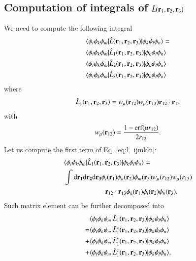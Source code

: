 \documentclass[aip,jcp,reprint,noshowkeys,superscriptaddress]{revtex4-1}
\newcommand{\matelem}[3]{\langle #1 | #2 | #3 \rangle}
\newcommand{\bri}[1]{{\bf r}_{#1}}
\newcommand{\dr}[1]{\text{d}{\bf r_{#1}}}
\begin{document}
\subsection{Computation of integrals of $\hat{L}(\bri{1},\bri{2},\bri{3})$}
We need to compute the following integral 
\begin{equation}
 \label{eq:l_ijmkln}
 \begin{aligned}
 & \matelem{\phi_i \phi_k \phi_m}{\hat{L}(\bri{1},\bri{2},\bri{3})}{\phi_k \phi_l \phi_n} = \\
 & \matelem{\phi_i \phi_k \phi_m}{\hat{L}_1(\bri{1},\bri{2},\bri{3})}{\phi_k \phi_l \phi_n} \\
 & \matelem{\phi_i \phi_k \phi_m}{\hat{L}_2(\bri{1},\bri{2},\bri{3})}{\phi_k \phi_l \phi_n} \\
 & \matelem{\phi_i \phi_k \phi_m}{\hat{L}_3(\bri{1},\bri{2},\bri{3})}{\phi_k \phi_l \phi_n} 
 \end{aligned}
\end{equation}
where 
\begin{equation}
 \hat{L}_1(\bri{1},\bri{2},\bri{3}) = w_\mu(\bri{12}) w_\mu(\bri{13}) \bri{12} \cdot \bri{13}
\end{equation}
with 
\begin{equation}
 w_\mu(\bri{12}) = \frac{1 - \text{erf}(\mu r_{12})}{2 r_{12}}.
\end{equation}
Let us compute the first term of Eq. \eqref{eq:l_ijmkln}:
\begin{equation}
 \begin{aligned}
 & \matelem{\phi_i \phi_k \phi_m}{\hat{L}_1(\bri{1},\bri{2},\bri{3})}{\phi_k \phi_l \phi_n} = \\
 & \int \dr{1} \dr{2} \dr{3} \phi_i(\bri{1}) \phi_u(\bri{2}) \phi_m(\bri{3}) w_{\mu}(r_{12}) w_{\mu}(r_{13}) \\ 
 &\qquad \qquad \qquad   \bri{12} \cdot \bri{13}  \phi_k(\bri{1}) \phi_l(\bri{2}) \phi_n(\bri{3}).
 \end{aligned}
\end{equation}
Such matrix element can be further decomposed into
\begin{equation}
 \begin{aligned}
 & \matelem{\phi_i \phi_k \phi_m}{\hat{L}_1(\bri{1},\bri{2},\bri{3})}{\phi_k \phi_l \phi_n}  \\
 =& \matelem{\phi_i \phi_k \phi_m}{\hat{L}_1^x(\bri{1},\bri{2},\bri{3})}{\phi_k \phi_l \phi_n} \\  
+ & \matelem{\phi_i \phi_k \phi_m}{\hat{L}_1^y(\bri{1},\bri{2},\bri{3})}{\phi_k \phi_l \phi_n} \\  
+ & \matelem{\phi_i \phi_k \phi_m}{\hat{L}_1^z(\bri{1},\bri{2},\bri{3})}{\phi_k \phi_l \phi_n},  
 \end{aligned}
\end{equation}
\end{document}
